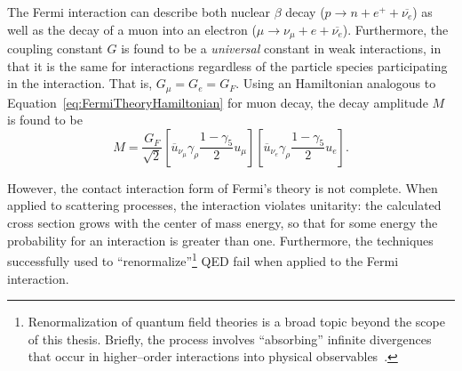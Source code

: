 The Fermi interaction can describe both nuclear $\beta$ decay ($p \to n + e^+ +
\overline{\nu_e}$) as well as the decay of a muon into an electron ($\mu \to
\nu_\mu + e + \overline{\nu_e}$).  Furthermore, the coupling constant $G$ is
found to be a \emph{universal} constant in weak interactions, in that it is the
same for interactions regardless of the particle species participating in the
interaction.  That is, $G_\mu = G_e = G_F$.  Using an Hamiltonian analogous to
Equation~\ref{eq:FermiTheoryHamiltonian} for muon decay, the decay amplitude $M$
is found to be
\begin{equation}
  M = \frac{G_F}{\sqrt{2}}
  \left[\overline u_{\nu_\mu} \gamma_\rho \frac{1 - \gamma_5}{2} u_\mu\right]  
  \left[\overline u_{\nu_e} \gamma_\rho \frac{1 - \gamma_5}{2} u_e\right].
  \label{eq:ContactAmplitudeMuonDecay}
\end{equation}

However, the contact interaction form of
Fermi's theory is not complete.  When applied to scattering processes, the
interaction violates unitarity: the calculated cross section grows with the
center of mass energy, so that for some energy the probability for an
interaction is greater than one.  Furthermore, the techniques successfully used
to ``renormalize''\footnote{Renormalization of quantum field theories is a broad
topic beyond the scope of this thesis.  Briefly, the process involves
``absorbing'' infinite divergences that occur in higher--order interactions into
physical observables~\cite{Griffiths:IntroParticle}.} QED fail when applied to
the Fermi interaction.


